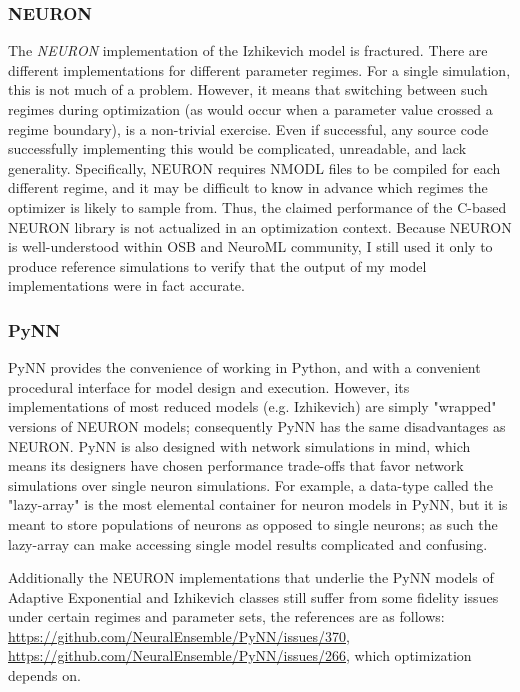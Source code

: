 \subsubsection{NEURON}
The \emph{NEURON} implementation of the Izhikevich model is fractured.
There are different implementations for different parameter regimes.
For a single simulation, this is not much of a problem.
However, it means that switching between such regimes during optimization (as would occur when a parameter value crossed a regime boundary), is a non-trivial exercise.
Even if successful, any source code successfully implementing this would be complicated, unreadable, and lack generality.
Specifically, NEURON requires NMODL files to be compiled for each different regime, and it may be difficult to know in advance which regimes the optimizer is likely to sample from.
Thus, the claimed performance of the C-based NEURON library is not actualized in an optimization context.
Because NEURON is well-understood within OSB and NeuroML community, I still used it only to produce reference simulations to verify that the output of my model implementations were in fact accurate.

\subsubsection{PyNN}
PyNN provides the convenience of working in Python, and with a convenient procedural interface for model design and execution.
However, its implementations of most reduced models (e.g. Izhikevich) are simply "wrapped" versions of NEURON models; consequently PyNN has the same disadvantages as NEURON.
PyNN is also designed with network simulations in mind, which means its designers have chosen performance trade-offs that favor network simulations over single neuron simulations.
For example, a data-type called the "lazy-array" is the most elemental container for neuron models in PyNN, but it is meant to store populations of neurons as opposed to single neurons;
as such the lazy-array can make accessing single model results complicated and confusing.


Additionally the NEURON implementations that underlie the PyNN models of Adaptive Exponential and Izhikevich classes still suffer from some fidelity issues under certain regimes and parameter sets, the references are as follows: \url{https://github.com/NeuralEnsemble/PyNN/issues/370}, \url{https://github.com/NeuralEnsemble/PyNN/issues/266}, which optimization depends on.

